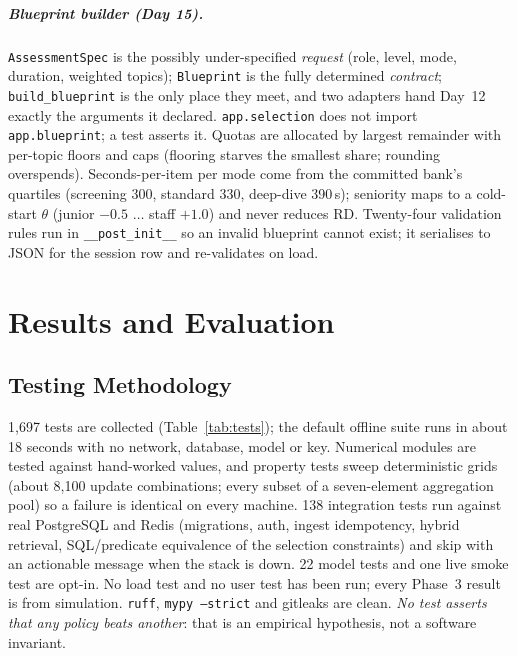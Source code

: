 \documentclass{tietreport}
\begin{document}
\paragraph{Blueprint builder (Day 15).} \texttt{AssessmentSpec} is the possibly under-specified
\emph{request} (role, level, mode, duration, weighted topics); \texttt{Blueprint} is the fully
determined \emph{contract}; \texttt{build\_blueprint} is the only place they meet, and two adapters
hand Day~12 exactly the arguments it declared. \texttt{app.selection} does not import
\texttt{app.blueprint}; a test asserts it. Quotas are allocated by largest remainder with per-topic
floors and caps (flooring starves the smallest share; rounding overspends). Seconds-per-item
per mode come from the committed bank's quartiles (screening 300, standard 330, deep-dive
390\,s); seniority maps to a cold-start $\theta$ (junior $-0.5$ $\ldots$ staff $+1.0$) and never
reduces RD. Twenty-four validation rules run in \texttt{\_\_post\_init\_\_} so an invalid blueprint
cannot exist; it serialises to JSON for the session row and re-validates on load.

\chapter{Results and Evaluation}
\label{ch:results}

\section{Testing Methodology}

1,697 tests are collected (Table~\ref{tab:tests}); the default offline suite runs in about 18
seconds with no network, database, model or key. Numerical modules are tested against
hand-worked values, and property tests sweep deterministic grids (about 8,100 update
combinations; every subset of a seven-element aggregation pool) so a failure is identical on
every machine. 138 integration tests run against real PostgreSQL and Redis (migrations, auth,
ingest idempotency, hybrid retrieval, SQL/predicate equivalence of the selection constraints)
and skip with an actionable message when the stack is down. 22 model tests and one live smoke
test are opt-in. No load test and no user test has been run; every Phase~3 result is from
simulation. \texttt{ruff}, \texttt{mypy --strict} and gitleaks are clean. \emph{No test asserts that
any policy beats another}: that is an empirical hypothesis, not a software invariant.
\end{document}
